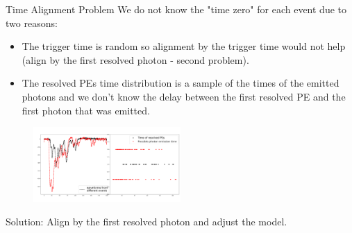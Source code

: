 \documentclass{beamer}
\begin{document}
\begin{frame}{Time Alignment Problem}
We do not know the "time zero" for each event due to two reasons:\\
\begin{itemize}
\item The trigger time is random so alignment by the trigger time would not help (align by the first resolved photon - second problem).
\item The resolved PEs time distribution is a sample of the times of the emitted photons and we don't know the delay between the first resolved PE and the first photon that was emitted.
\end{itemize}
\begin{figure}[h]
\includegraphics[width=0.5\textwidth]{alignment.png}
\end{figure}
Solution: Align by the first resolved photon and adjust the model.  
\end{frame}
\end{document}
